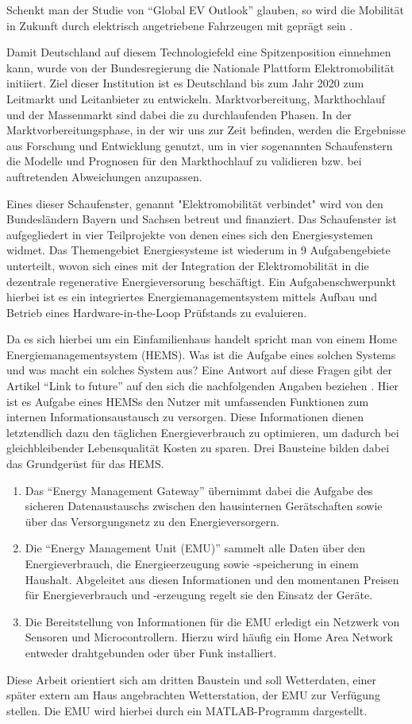 Schenkt man der Studie von \enquote{Global EV Outlook} glauben, so wird die Mobilität in Zukunft durch elektrisch angetriebene Fahrzeugen mit geprägt sein \cite{EVOutlook}.

Damit Deutschland auf diesem Technologiefeld eine Spitzenposition einnehmen kann, wurde von der Bundesregierung die Nationale Plattform Elektromobilität initiiert. Ziel dieser Institution ist es Deutschland bis zum Jahr 2020 zum Leitmarkt und Leitanbieter zu entwickeln. Marktvorbereitung, Markthochlauf und der Massenmarkt sind dabei die zu durchlaufenden Phasen. In der Marktvorbereitungsphase, in der wir uns zur Zeit befinden, werden die Ergebnisse aus Forschung und Entwicklung genutzt, um in vier sogenannten Schaufenstern die Modelle und Prognosen für den Markthochlauf zu validieren bzw. bei auftretenden Abweichungen anzupassen.\cite{NPE} 

Eines dieser Schaufenster, genannt "{}Elektromobilität verbindet"{} wird von den Bundesländern Bayern und Sachsen betreut und finanziert. Das Schaufenster ist aufgegliedert in vier Teilprojekte von denen eines sich den Energiesystemen widmet. Das Themengebiet Energiesysteme ist wiederum in 9 Aufgabengebiete unterteilt, wovon sich eines mit der Integration der Elektromobilität in die dezentrale regenerative Energieversorung beschäftigt. Ein Aufgabenschwerpunkt hierbei ist es ein integriertes Energiemanagementsystem mittels Aufbau und Betrieb eines Hardware-in-the-Loop Prüfstands zu evaluieren.\cite{SEEV}

Da es sich hierbei um ein Einfamilienhaus handelt spricht man von einem Home Energiemanagementsystem (HEMS). Was ist die Aufgabe eines solchen Systems und was macht ein solches System aus? Eine Antwort auf diese Fragen gibt der Artikel \enquote{Link to future} auf den sich die nachfolgenden Angaben beziehen \cite{LtoF}. Hier ist es Aufgabe eines HEMSs den Nutzer mit umfassenden Funktionen zum internen Informationsaustausch zu versorgen. Diese Informationen dienen letztendlich dazu den täglichen Energieverbrauch zu optimieren, um dadurch bei gleichbleibender Lebensqualität Kosten zu sparen. Drei Bausteine bilden dabei das Grundgerüst für das HEMS. 
\begin{enumerate}
\item Das \enquote{Energy Management Gateway} übernimmt dabei die Aufgabe des sicheren Datenaustauschs zwischen den hausinternen Gerätschaften sowie über das Versorgungsnetz zu den Energieversorgern. 
\item Die \enquote{Energy Management Unit (EMU)} sammelt alle Daten über den Energieverbrauch, die Energieerzeugung sowie -speicherung in einem Haushalt. Abgeleitet aus diesen Informationen und den momentanen Preisen für Energieverbrauch und -erzeugung regelt sie den Einsatz der Geräte. 
\item Die Bereitstellung von Informationen für die EMU erledigt ein Netzwerk von Sensoren und Microcontrollern. Hierzu wird häufig ein Home Area Network entweder drahtgebunden oder über Funk installiert.     
\end{enumerate} 
Diese Arbeit orientiert sich am dritten Baustein und soll Wetterdaten, einer später extern am Haus angebrachten Wetterstation, der EMU zur Verfügung stellen. Die EMU wird hierbei durch ein MATLAB-Programm dargestellt. 